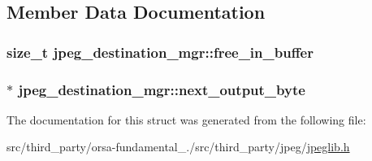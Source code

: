 \subsection{Member Data Documentation}
\hypertarget{structjpeg__destination__mgr_a397cc63a089447fe96e35062c4979906}{}
\subsubsection[{free\+\_\+in\+\_\+buffer}]{\setlength{\rightskip}{0pt plus 5cm}size\+\_\+t jpeg\+\_\+destination\+\_\+mgr\+::free\+\_\+in\+\_\+buffer}\label{structjpeg__destination__mgr_a397cc63a089447fe96e35062c4979906}
\hypertarget{structjpeg__destination__mgr_a3dac0ab8cc4daeb1efb9fea2e07449c0}{}
\subsubsection[{next\+\_\+output\+\_\+byte}]{$\ast$ jpeg\+\_\+destination\+\_\+mgr\+::next\+\_\+output\+\_\+byte}\label{structjpeg__destination__mgr_a3dac0ab8cc4daeb1efb9fea2e07449c0}


The documentation for this struct was generated from the following file\+:\begin{DoxyCompactItemize}
\item 
src/third\+\_\+party/orsa-\/fundamental\+\_./src/third\+\_\+party/jpeg/\hyperlink{jpeglib_8h}{jpeglib.\+h}\end{DoxyCompactItemize}
